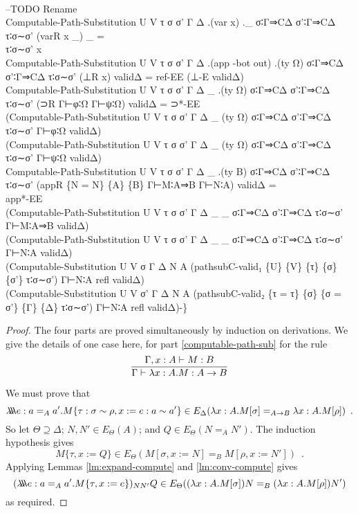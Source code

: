 {\begin{code}
{\>\<\\
\>--TODO Rename\<\\
\>Computable-Path-Substitution U V τ σ σ' Γ Δ .(var x) .\_ σ∶Γ⇒CΔ σ'∶Γ⇒CΔ τ∶σ∼σ' (varR x \_) \_ = \<\\
\>  τ∶σ∼σ' x\<\\
\>Computable-Path-Substitution U V τ σ σ' Γ Δ .(app -bot out) .(ty Ω) σ∶Γ⇒CΔ σ'∶Γ⇒CΔ τ∶σ∼σ' (⊥R x) validΔ = ref-EE (⊥-E validΔ)\<\\
\>Computable-Path-Substitution U V τ σ σ' Γ Δ \_ .(ty Ω) σ∶Γ⇒CΔ σ'∶Γ⇒CΔ τ∶σ∼σ' (⊃R Γ⊢φ∶Ω Γ⊢ψ∶Ω) validΔ = ⊃*-EE \<\\
\>  (Computable-Path-Substitution U V τ σ σ' Γ Δ \_ (ty Ω) σ∶Γ⇒CΔ σ'∶Γ⇒CΔ τ∶σ∼σ' Γ⊢φ∶Ω validΔ) \<\\
\>  (Computable-Path-Substitution U V τ σ σ' Γ Δ \_ (ty Ω) σ∶Γ⇒CΔ σ'∶Γ⇒CΔ τ∶σ∼σ' Γ⊢ψ∶Ω validΔ) \<\\
\>Computable-Path-Substitution U V τ σ σ' Γ Δ \_ .(ty B) σ∶Γ⇒CΔ σ'∶Γ⇒CΔ τ∶σ∼σ' (appR \{N = N\} \{A\} \{B\} Γ⊢M∶A⇒B Γ⊢N∶A) validΔ = \<\\
\>  app*-EE \<\\
\>  (Computable-Path-Substitution U V τ σ σ' Γ Δ \_ \_ σ∶Γ⇒CΔ σ'∶Γ⇒CΔ τ∶σ∼σ' Γ⊢M∶A⇒B validΔ) \<\\
\>  (Computable-Path-Substitution U V τ σ σ' Γ Δ \_ \_ σ∶Γ⇒CΔ σ'∶Γ⇒CΔ τ∶σ∼σ' Γ⊢N∶A validΔ)\<\\
\>  (Computable-Substitution U V σ Γ Δ N A (pathsubC-valid₁ \{U\} \{V\} \{τ\} \{σ\} \{σ'\} τ∶σ∼σ') Γ⊢N∶A refl validΔ)\<\\
\>  (Computable-Substitution U V σ' Γ Δ N A (pathsubC-valid₂ \{τ = τ\} \{σ\} \{σ = σ'\} \{Γ\} \{Δ\} τ∶σ∼σ') Γ⊢N∶A refl validΔ)-\}}\<%
\end{code}
}

\begin{proof}
The four parts are proved simultaneously by induction on derivations.  We give the details of
one case here, for part \ref{computable-path-sub} for the rule
\[ \infer{\Gamma \vdash \lambda x:A.M : A \rightarrow B}{\Gamma, x : A \vdash M : B} \]

We must prove that 
\[ \lambda \!\! \lambda \!\! \lambda e:a =_A a' . M \{ \tau : \sigma \sim \rho, x := e : a \sim a' \} \in E_\Delta(\lambda x:A.M[\sigma] =_{A \rightarrow B} \lambda x:A.M[\rho]) \enspace . \]
So let $\Theta \supseteq \Delta$; $N, N' \in E_\Theta(A)$; and $Q \in E_\Theta(N =_A N')$.  The induction hypothesis gives
\[ M \{ \tau , x := Q \} \in E_\Theta(M[\sigma, x:= N] =_B M [ \rho, x := N' ]) \enspace . \]
Applying Lemmas \ref{lm:expand-compute} and \ref{lm:conv-compute} gives
\[ (\lambda \!\! \lambda \!\! \lambda e:a =_A a' . M \{ \tau, x := e \})_{N N'} Q \in E_\Theta((\lambda x:A.M[\sigma]) N =_B (\lambda x:A.M[\rho]) N') \]
as required.
\end{proof}

